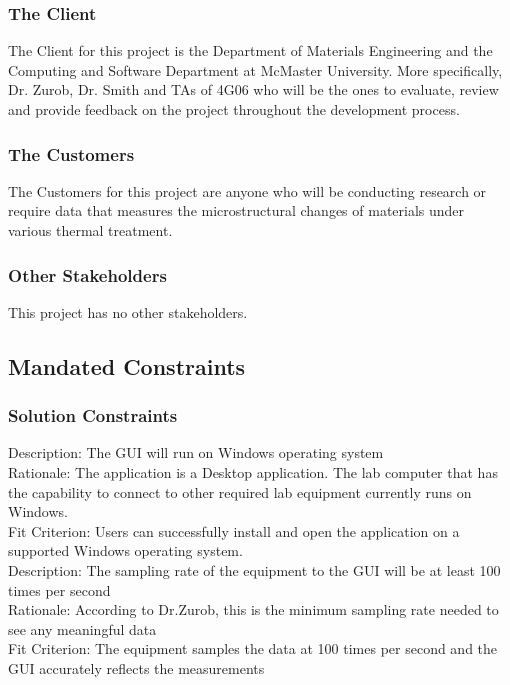 \documentclass[12pt, titlepage]{article}
\begin{document}
\subsubsection{The Client}
The Client for this project is the Department of Materials Engineering and the Computing and Software Department at McMaster University. More specifically, Dr. Zurob, Dr. Smith and TAs of 4G06 who will be the ones to evaluate, review and provide feedback on the project throughout the development process.

\subsubsection{The Customers}
The Customers for this project are anyone who will be conducting research or require data that measures the microstructural changes of materials under various thermal treatment.   

\subsubsection{Other Stakeholders}
This project has no other stakeholders.

\subsection{Mandated Constraints}

\subsubsection{Solution Constraints}

Description: The GUI will run on Windows operating system\\ 
Rationale: The application is a Desktop application. The lab computer that has the capability to connect to other required lab equipment currently runs on Windows.\\
Fit Criterion: Users can successfully install and open the application on a supported Windows operating system. \\

\noindent Description: The sampling rate of the equipment to the GUI will be at least 100 times per second\\ 
Rationale: According to Dr.Zurob, this is the minimum sampling rate needed to see any meaningful data\\
Fit Criterion: The equipment samples the data at 100 times per second and the GUI accurately reflects the measurements  \\
\end{document}
